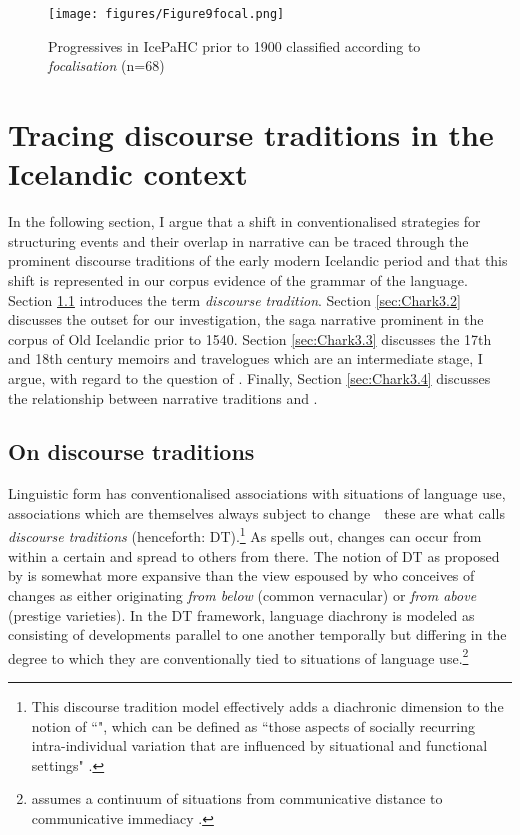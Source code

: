 \documentclass[output=paper,colorlinks,citecolor=brown]{langscibook}
\begin{document}
 \begin{figure}
        \texttt{[image: figures/Figure9focal.png]}
        \caption{Progressives in IcePaHC prior to 1900 classified according to \textit{focalisation} (n=68)}
        \label{fig:progicepahcclass}
\end{figure}


\section{Tracing discourse traditions in the Icelandic context}\label{sec:Chark3}

In the following section, I argue that a shift in conventionalised strategies for structuring events and their overlap in narrative can be traced through the prominent discourse traditions of the early modern Icelandic period and that this shift is represented in our corpus evidence of the grammar of the language. Section \ref{sec:Chark3.1} introduces the term \textit{discourse tradition}. Section \ref{sec:Chark3.2} discusses the outset for our investigation, the saga  narrative prominent in the corpus of Old Icelandic prior to 1540. Section \ref{sec:Chark3.3} discusses the 17th and 18th century memoirs and travelogues which are an intermediate stage, I argue, with regard to the question of . Finally, Section \ref{sec:Chark3.4} discusses the relationship between narrative traditions and .

\subsection{On discourse traditions}\label{sec:Chark3.1}
\largerpage
Linguistic form has conventionalised associations with situations of language use, associations which are themselves always subject to change\ \textendash{}\  these are what \citet{koch1987distanz} calls \textit{discourse traditions} (henceforth: DT).\footnote{This discourse tradition model effectively adds a diachronic dimension to the notion of ``", which can be defined as ``those aspects of socially recurring intra-individual variation that are influenced by situational and functional settings" \citep[3]{Luedeling202frametext}.} As \citet{kabatek2024} spells out, changes can occur from within a certain   and spread to others from there. The notion of DT  as proposed by \citet{kabatek2024} is somewhat more expansive than the view espoused by \citet[123]{labov1972sociolinguistic} who 
conceives of changes as either originating \textit{from below} (common vernacular) or \textit{from above} (prestige varieties). In the DT  framework, language diachrony is modeled as consisting of developments parallel to one another temporally but differing in the degree to which they are conventionally tied to situations of language use.\footnote{\citet{kabatek2024} assumes a continuum of situations from communicative distance to communicative immediacy \citep{koch1985sprache}.}
\end{document}
